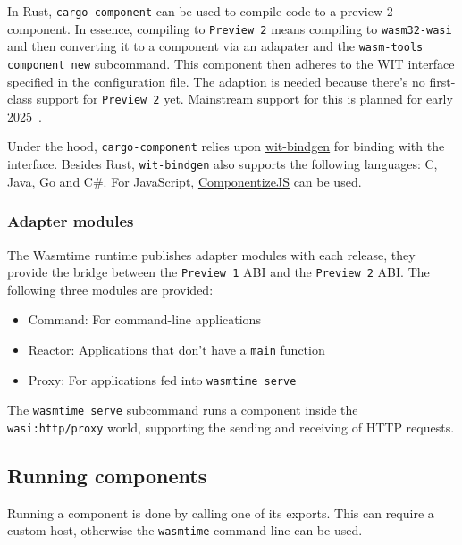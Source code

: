 In Rust, \texttt{cargo-component} can be used to compile code to a preview 2 component. In essence, compiling to \texttt{Preview 2} means compiling to \texttt{wasm32-wasi} and then converting it to a component via an adapater and the \texttt{wasm-tools component new} subcommand. This component then adheres to the \gls{WIT} interface specified in the configuration file. The adaption is needed because there's no first-class support for \texttt{Preview 2} yet. Mainstream support for this is planned for early 2025~\cite{rust:p2}.

Under the hood, \texttt{cargo-component} relies upon \href{https://github.com/bytecodealliance/wit-bindgen}{wit-bindgen} for binding with the interface. Besides Rust, \texttt{wit-bindgen} also supports the following languages: C, Java, Go and C\#. For JavaScript, \href{https://github.com/bytecodealliance/ComponentizeJS}{ComponentizeJS} can be used.

\subsubsection{Adapter modules}

The Wasmtime runtime publishes adapter modules with each release, they provide the bridge between the \texttt{Preview 1} \gls{ABI} and the \texttt{Preview 2} \gls{ABI}. The following three modules are provided:

\begin{itemize}
    \item Command: For command-line applications
    \item Reactor: Applications that don't have a \texttt{main} function
    \item Proxy: For applications fed into \texttt{wasmtime serve}
\end{itemize}

The \texttt{wasmtime serve} subcommand runs a component inside the \texttt{wasi:http/proxy} world, supporting the sending and receiving of HTTP requests.

\subsection{Running components}
\label{sec:host}

Running a component is done by calling one of its exports. This can require a custom host, otherwise the \texttt{wasmtime} command line can be used.

